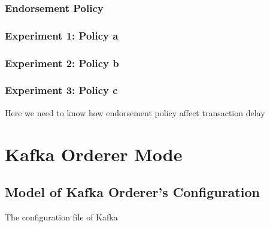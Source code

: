 \documentclass[10pt,journal,compsoc, twoside]{IEEEtran}
\begin{document}
\subsubsection{Endorsement Policy} 

\subsubsection{Experiment 1: Policy a}


\subsubsection{Experiment 2: Policy b}


\subsubsection{Experiment 3: Policy c}

Here we need to know how endorsement policy affect transaction delay





\section{Kafka Orderer Mode}


\subsection{Model of Kafka Orderer's Configuration}

The configuration file of Kafka




\ifCLASSOPTIONcaptionsoff
  \newpage
\fi





\vspace{240pt}
\end{document}
